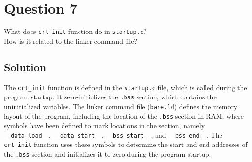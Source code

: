 \section*{Question 7}

What does \texttt{crt\_init} function do in \texttt{startup.c}? \\
How is it related to the linker command file?

\subsection*{Solution}

The \texttt{crt\_init} function is defined in the \texttt{startup.c} file, which is called during the program startup.
It zero-initializes the \texttt{.bss} section, which contains the uninitialized variables.
The linker command file (\texttt{bare.ld}) defines the memory layout of the program, including the location of the \texttt{.bss} section in RAM, where symbols have been defined to mark locations in the section, namely \texttt{\_\_data\_load\_\_}, \texttt{\_\_data\_start\_\_}, \texttt{\_\_bss\_start\_\_}, and \texttt{\_\_bss\_end\_\_}.
The \texttt{crt\_init} function uses these symbols to determine the start and end addresses of the \texttt{.bss} section and initializes it to zero during the program startup.
